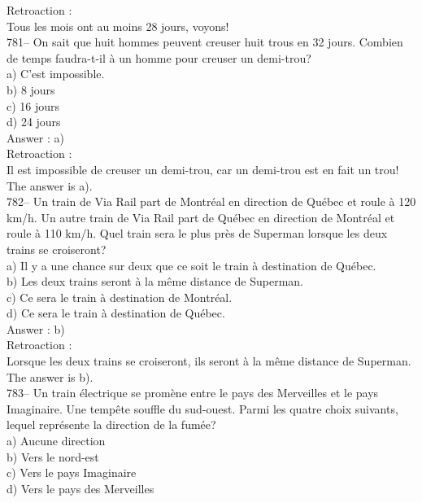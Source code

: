 ﻿\documentclass[letterpaper, 12pt]{article}
\begin{document}
Retroaction : \\
Tous les mois ont au moins 28 jours, voyons!  \\

781-- On sait que huit hommes peuvent creuser huit trous en 32 jours.
Combien de temps faudra-t-il \`a un homme pour creuser un demi-trou?\\
a) C'est impossible.\\
b) 8 jours\\
c) 16 jours\\
d) 24 jours\\

Answer : a)\\

Retroaction : \\
Il est impossible de creuser un demi-trou, car un demi-trou est en fait un
trou!  The answer is a).\\

782-- Un train de Via Rail part de Montr\'eal en direction de Qu\'ebec et
roule \`a 120 km/h.  Un autre train de Via Rail part de Qu\'ebec en
direction de Montr\'eal et roule \`a 110 km/h.  Quel train sera le plus
pr\`es de Superman lorsque les deux trains  se croiseront?\\
a) Il y a une chance sur deux que ce soit le train \`a destination de
Qu\'ebec.\\
b) Les deux trains seront \`a la m\^eme distance de Superman.\\
c) Ce sera le train \`a destination de Montr\'eal.\\
d) Ce sera le train \`a destination de Qu\'ebec.\\

Answer : b)\\

Retroaction : \\
Lorsque les deux trains se croiseront, ils seront \`a la m\^eme distance de
Superman.  The answer is b).\\

783-- Un train \'electrique se prom\`ene entre le pays des Merveilles et le
pays Imaginaire.  Une temp\^ete souffle du sud-ouest.  Parmi les quatre
choix suivants, lequel repr\'esente la direction de la fum\'ee?\\
a) Aucune direction\\
b) Vers le nord-est\\
c) Vers le pays Imaginaire\\
d) Vers le pays des Merveilles\\
\end{document}
